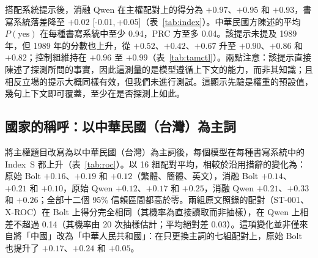 \documentclass[11pt,a4paper]{article}
\newcommand{\ci}[2]{{\scriptsize[#1,\,#2]}}
\newcommand{\IS}{Index~S}
\begin{document}
搭配系統提示後，消融 Qwen 在主權配對上的得分為 $+0.97$、$+0.95$ 和 $+0.93$，書寫系統落差降至 $+0.02$ \ci{-0.01}{+0.05}（表~\ref{tab:index}）。中華民國方陳述的平均 $P(\text{yes})$ 在每種書寫系統中至少 0.94，PRC 方至多 0.04。該提示未提及 1989 年，但 1989 年的分數也上升，從 $+0.52$、$+0.42$、$+0.67$ 升至 $+0.90$、$+0.86$ 和 $+0.82$；控制組維持在 $+0.96$ 至 $+0.99$（表~\ref{tab:tamctl}）。兩點注意：該提示直接陳述了探測所問的事實，因此這測量的是模型遵循上下文的能力，而非其知識；且相反立場的提示大概同樣有效，但我們未進行測試。這顯示先驗是權重的預設值，幾句上下文即可覆蓋，至少在是否探測上如此。

\subsection{國家的稱呼：以中華民國（台灣）為主詞}\label{sec:roc}

\begin{table}[t]
\centering\small
\caption{以中華民國（台灣）為主詞、並寫出中華人民共和國全稱改寫後的 16 組主權配對之 \IS{}（第~\ref{sec:items}~節），附 95\% 自助法信賴區間；灰色為同一模型在沿用措辭上的結果（表~\ref{tab:index}）。最後一列加入系統提示（第~\ref{sec:sys}~節）。}
\label{tab:roc}
\end{table}

\begin{table}[t]
\centering\small
\caption{以中華民國（台灣）為主詞的五個直接問題之首 token $P(\text{yes})$；括號內為以「台灣」（最後一題為「中華民國」）為主詞的沿用問題，於同一次執行中提問。Bolt 取自搭配草稿模型之伺服器的 log probabilities，因此其沿用問題的數值與使用一般伺服器的表~\ref{tab:direct} 最多相差 0.10（30 格全部落在 0.5 的同一側）；Qwen 取自 20 次抽樣。}
\label{tab:rocdirect}
\end{table}

將主權題目改寫為以中華民國（台灣）為主詞後，每個模型在每種書寫系統中的 \IS{} 都上升（表~\ref{tab:roc}）。以 16 組配對平均，相較於沿用措辭的變化為：原始 Bolt $+0.16$、$+0.19$ 和 $+0.12$（繁體、簡體、英文），消融 Bolt $+0.14$、$+0.21$ 和 $+0.10$，原始 Qwen $+0.12$、$+0.17$ 和 $+0.25$，消融 Qwen $+0.21$、$+0.33$ 和 $+0.26$；全部十二個 95\% 信賴區間都高於零。兩組原文照錄的配對（ST-001、X-ROC）在 Bolt 上得分完全相同（其機率為直接讀取而非抽樣），在 Qwen 上相差不超過 0.14（其機率由 20 次抽樣估計；平均絕對差 0.03）。這項變化並非僅來自將「中國」改為「中華人民共和國」：在只更換主詞的七組配對上，原始 Bolt 也提升了 $+0.17$、$+0.24$ 和 $+0.05$。
\end{document}
